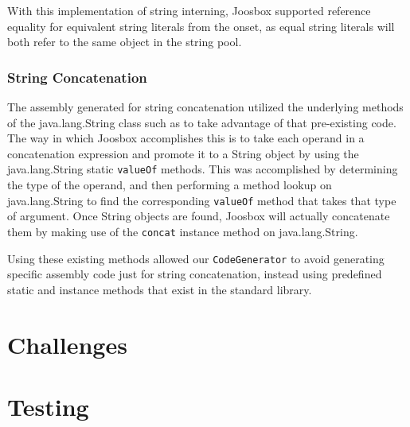 \documentclass[letterpaper]{article}
\begin{document}
  With this implementation of string interning, Joosbox supported reference
  equality for equivalent string literals from the onset, as equal string literals
  will both refer to the same object in the string pool.

  \subsubsection{String Concatenation}

  The assembly generated for string concatenation utilized the underlying
  methods of the java.lang.String class such as to take advantage of that
  pre-existing code. The way in which Joosbox accomplishes this is to take each
  operand in a concatenation expression and promote it to a String object by
  using the java.lang.String static {\tt valueOf} methods. This was accomplished
  by determining the type of the operand, and then performing a method lookup on
  java.lang.String to find the corresponding {\tt valueOf} method that takes
  that type of argument. Once String objects are found, Joosbox will actually
  concatenate them by making use of the {\tt concat} instance
  method on java.lang.String.

  Using these existing methods allowed our {\tt CodeGenerator} to avoid
  generating specific assembly code just for string concatenation, instead
  using predefined static and instance methods that exist in the standard
  library.

  \section{Challenges}


  \section{Testing}
\end{document}
